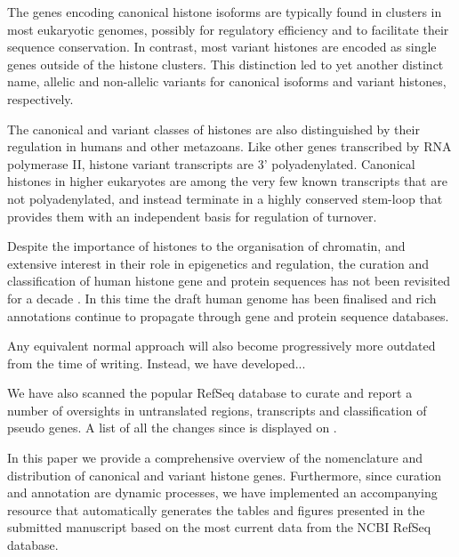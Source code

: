   The genes encoding canonical histone isoforms are typically found in clusters in most eukaryotic
  genomes, possibly for regulatory efficiency and to facilitate their sequence conservation. In
  contrast, most variant histones are encoded as single genes outside of the histone clusters.
  This distinction led to yet another distinct name, allelic and non-allelic variants for
  canonical isoforms and variant histones, respectively\addref{}.

  The canonical and variant classes of histones are also distinguished by their regulation in humans and other
  metazoans. Like other genes transcribed by RNA polymerase II,  histone variant transcripts
  are 3' polyadenylated. Canonical histones in higher eukaryotes are among the very few known transcripts
  that are not polyadenylated, and instead terminate in a highly conserved stem-loop that
  provides them with an independent basis for regulation of turnover.


  Despite the importance of histones to the organisation of chromatin, and extensive interest
  in their role in epigenetics and regulation, the curation and classification of human histone
  gene and protein sequences has not been revisited for a decade \citep{Marzluff02}. In this time
  the draft human genome has been finalised and rich annotations continue to propagate through
  gene and protein sequence databases.

  Any equivalent normal approach will also become progressively more outdated from the
  time of writing. Instead, we have developed...

  We have also scanned the popular RefSeq
  database to curate and report a number of oversights in untranslated regions, transcripts and
  classification of pseudo genes. A list of all the changes since \cite{Marzluff02} is 
  displayed on .

  In this paper we provide a comprehensive overview of the nomenclature and distribution
  of canonical and variant histone genes. Furthermore, since curation and annotation are
  dynamic processes, we have implemented an accompanying resource that automatically generates
  the tables and figures presented in the submitted manuscript based
  on the most current data from the NCBI RefSeq database.


